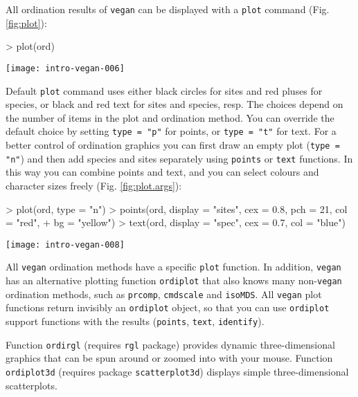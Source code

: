 \documentclass[a4paper,10pt]{amsart}
\begin{document}
All ordination results of \texttt{vegan} can be displayed with a
\texttt{plot} command (Fig. \ref{fig:plot}):
\begin{Schunk}
\begin{Sinput}
> plot(ord)
\end{Sinput}
\end{Schunk}
\begin{SCfigure}
\texttt{[image: intro-vegan-006]}
\caption{Default ordination plot.}
\label{fig:plot}
\end{SCfigure}
Default \texttt{plot} command uses either black circles for sites and
red pluses for species, or black and red text for sites and species,
resp.  The choices depend on the number of items in the plot and
ordination method.  You can override the default choice by setting
\texttt{type = "p"} for points, or \texttt{type = "t"} for text.  For
a better control of ordination graphics you can first draw an empty
plot (\texttt{type = "n"}) and then add species and sites separately
using \texttt{points} or \texttt{text} functions.  In this way you can
combine points and text, and you can select colours and character
sizes freely (Fig. \ref{fig:plot.args}):
\begin{Schunk}
\begin{Sinput}
> plot(ord, type = "n")
> points(ord, display = "sites", cex = 0.8, pch = 21, col = "red", 
+     bg = "yellow")
> text(ord, display = "spec", cex = 0.7, col = "blue")
\end{Sinput}
\end{Schunk}
\begin{SCfigure}
\texttt{[image: intro-vegan-008]}
\caption{A more colourful ordination plot where sites are points, and
  species are text.}
\label{fig:plot.args}
\end{SCfigure}

All \texttt{vegan} ordination methods have a specific \texttt{plot}
function.  In addition, \texttt{vegan} has an alternative plotting
function \texttt{ordiplot} that also knows many non-\texttt{vegan}
ordination methods, such as \texttt{prcomp}, \texttt{cmdscale} and
\texttt{isoMDS}.  All \texttt{vegan} plot functions return invisibly
an \texttt{ordiplot} object, so that you can use \texttt{ordiplot}
support functions with the results (\texttt{points}, \texttt{text},
\texttt{identify}).

Function \texttt{ordirgl} (requires \texttt{rgl} package) provides
dynamic three-dimensional graphics that can be spun around or zoomed
into with your mouse.  Function \texttt{ordiplot3d} (requires package
\texttt{scatterplot3d}) displays simple three-dimensional
scatterplots.
\end{document}
